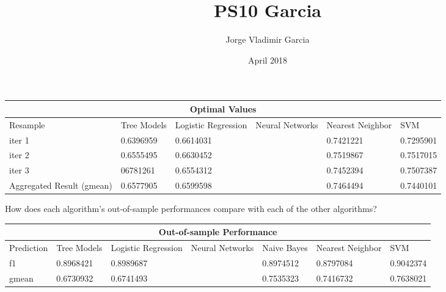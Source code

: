 \documentclass{article}
\title{PS10 Garcia}
\author{Jorge Vladimir Garcia}
\date{April 2018}
\begin{document}
\maketitle
\begin{center}
\begin{tabular}{ |p{3cm}||p{2cm}|p{2cm}|p{2cm}|p{2cm}|p{2cm}|}
 \hline
 \multicolumn{6}{|c|}{Optimal Values}\\
 \hline
 Resample & Tree Models & Logistic Regression & Neural Networks & Nearest Neighbor & SVM\\
 \hline
iter 1 & 0.6396959 & 0.6614031 & & 0.7421221 & 0.7295901 \\
iter 2 & 0.6555495 &  0.6630452 & & 0.7519867 & 0.7517015 \\
iter 3 & 06781261 &0.6554312 & & 0.7452394 & 0.7507387 \\

Aggregated Result (gmean) & 0.6577905 & 0.6599598 & &0.7464494 &0.7440101\\
 \hline
\end{tabular}
\end{center}

How does each algorithm's out-of-sample performances compare with each of the other algorithms?

\begin{center}
\begin{tabular}{ |p{2cm}||p{2cm}|p{2cm}|p{2cm}|p{2cm}|p{2cm}|p{2cm}|}
 \hline
 \multicolumn{7}{|c|}{Out-of-sample Performance}\\
 \hline
 Prediction & Tree Models & Logistic Regression & Neural Networks & Naive Bayes & Nearest Neighbor & SVM\\
 \hline
f1    & 0.8968421 & 0.8989687 & & 0.8974512 & 0.8797084 &0.9042374\\ 
gmean & 0.6730932 & 0.6741493 & & 0.7535323 & 0.7416732 &0.7638021 \\
 \hline 
\end{tabular}
\end{center}
\end{document}
